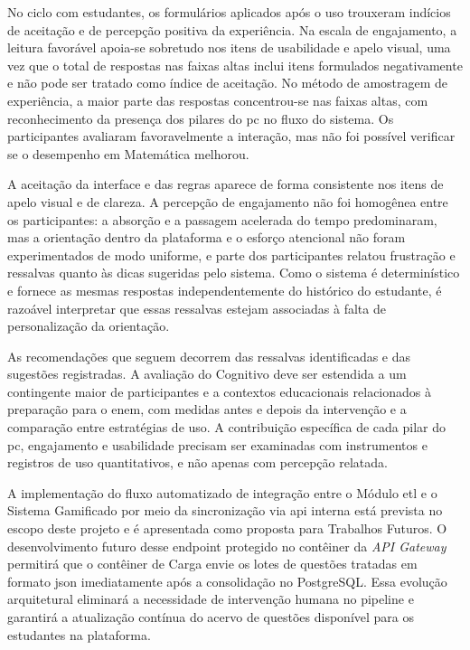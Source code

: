 No ciclo com estudantes, os formulários aplicados após o uso trouxeram indícios de aceitação e de percepção positiva da experiência. Na escala de engajamento, a leitura favorável apoia-se sobretudo nos itens de usabilidade e apelo visual, uma vez que o total de respostas nas faixas altas inclui itens formulados negativamente e não pode ser tratado como índice de aceitação. No método de amostragem de experiência, a maior parte das respostas concentrou-se nas faixas altas, com reconhecimento da presença dos pilares do \gls{pc} no fluxo do sistema. Os participantes avaliaram favoravelmente a interação, mas não foi possível verificar se o desempenho em Matemática melhorou. 

A aceitação da interface e das regras aparece de forma consistente nos itens de apelo visual e de clareza. A percepção de engajamento não foi homogênea entre os participantes: a absorção e a passagem acelerada do tempo predominaram, mas a orientação dentro da plataforma e o esforço atencional não foram experimentados de modo uniforme, e parte dos participantes relatou frustração e ressalvas quanto às dicas sugeridas pelo sistema. Como o sistema é determinístico e fornece as mesmas respostas independentemente do histórico do estudante, é razoável interpretar que essas ressalvas estejam associadas à falta de personalização da orientação.

As recomendações que seguem decorrem das ressalvas identificadas e das sugestões registradas. A avaliação do Cognitivo deve ser estendida a um contingente maior de participantes e a contextos educacionais relacionados à preparação para o \gls{enem}, com medidas antes e depois da intervenção e a comparação entre estratégias de uso. A contribuição específica de cada pilar do \gls{pc}, engajamento e usabilidade precisam ser examinadas com instrumentos e registros de uso quantitativos, e não apenas com percepção relatada.

A implementação do fluxo automatizado de integração entre o Módulo \gls{etl} e o
Sistema Gamificado por meio da sincronização via \gls{api} interna está prevista no
escopo deste projeto e é apresentada como proposta para Trabalhos Futuros. O
desenvolvimento futuro desse endpoint protegido no contêiner da \textit{API Gateway} permitirá que o contêiner de Carga envie os lotes de questões tratadas
em formato \gls{json} imediatamente após a consolidação no PostgreSQL. Essa evolução
arquitetural eliminará a necessidade de intervenção humana no pipeline e
garantirá a atualização contínua do acervo de questões disponível para os
estudantes na plataforma.

